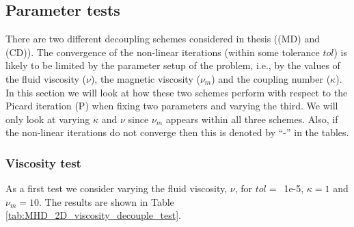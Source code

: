 \subsection{Parameter tests}
\label{sec:ParaTest}

There are two different decoupling schemes considered in thesis ((MD) and (CD)). The convergence of the non-linear iterations (within some tolerance $tol$) is likely to be limited by the parameter setup of the problem, i.e., by the values of the fluid viscosity ($\nu$), the magnetic viscosity ($\nu_m$) and the coupling number ($\kappa$). In this section we will look at how these two schemes perform with respect to the Picard iteration (P) when fixing two parameters and varying the third. We will only look at varying $\kappa$ and $\nu$ since $\nu_m$ appears within all three schemes. Also, if the non-linear iterations do not converge then this is denoted by ``-'' in the tables.


\subsubsection{Viscosity test}

As a first test we consider  varying the fluid viscosity, $\nu$, for  $tol=$~1e-5, $\kappa = 1$ and $\nu_m = 10$. The results are shown in Table \ref{tab:MHD_2D_viscosity_decouple_test}.


